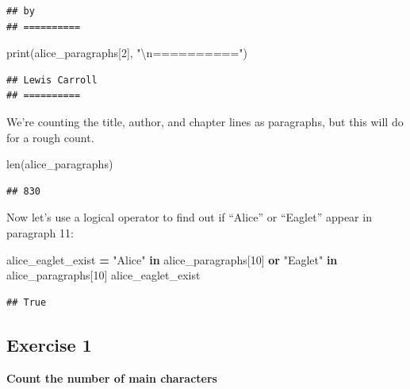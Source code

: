 \documentclass[]{book}
\newenvironment{Shaded}{\begin{snugshade}}{\end{snugshade}}
\newcommand{\BuiltInTok}[1]{#1}
\newcommand{\CharTok}[1]{\textcolor[rgb]{0.31,0.60,0.02}{#1}}
\newcommand{\DecValTok}[1]{\textcolor[rgb]{0.00,0.00,0.81}{#1}}
\newcommand{\KeywordTok}[1]{\textcolor[rgb]{0.13,0.29,0.53}{\textbf{#1}}}
\newcommand{\NormalTok}[1]{#1}
\newcommand{\OperatorTok}[1]{\textcolor[rgb]{0.81,0.36,0.00}{\textbf{#1}}}
\newcommand{\StringTok}[1]{\textcolor[rgb]{0.31,0.60,0.02}{#1}}
\begin{document}
\begin{verbatim}
## by 
## ==========
\end{verbatim}

\begin{Shaded}
\begin{Highlighting}[]
\BuiltInTok{print}\NormalTok{(alice_paragraphs[}\DecValTok{2}\NormalTok{], }\StringTok{"}\CharTok{\textbackslash{}n}\StringTok{=========="}\NormalTok{)}
\end{Highlighting}
\end{Shaded}

\begin{verbatim}
## Lewis Carroll 
## ==========
\end{verbatim}

We're counting the title, author, and chapter lines as paragraphs, but this will do for a rough count.

\begin{Shaded}
\begin{Highlighting}[]
\BuiltInTok{len}\NormalTok{(alice_paragraphs)}
\end{Highlighting}
\end{Shaded}

\begin{verbatim}
## 830
\end{verbatim}

Now let's use a logical operator to find out if ``Alice'' or ``Eaglet'' appear in paragraph 11:

\begin{Shaded}
\begin{Highlighting}[]
\NormalTok{alice_eaglet_exist }\OperatorTok{=} \StringTok{"Alice"} \KeywordTok{in}\NormalTok{ alice_paragraphs[}\DecValTok{10}\NormalTok{] }\KeywordTok{or} \StringTok{"Eaglet"} \KeywordTok{in}\NormalTok{ alice_paragraphs[}\DecValTok{10}\NormalTok{]}
\NormalTok{alice_eaglet_exist}
\end{Highlighting}
\end{Shaded}

\begin{verbatim}
## True
\end{verbatim}

\hypertarget{exercise-1-4}{%
\subsection{Exercise 1}\label{exercise-1-4}}

\textbf{Count the number of main characters}
\end{document}
